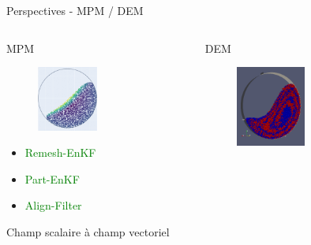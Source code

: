 \documentclass[aspectratio=169]{beamer} %
\newcommand{\cmark}{\ding{51}}%
\begin{document}
\begin{frame}{Perspectives - MPM / DEM}
    \vspace{-0.5cm}
    \begin{columns}[t]
        \begin{column}{0.5\textwidth}
            \small
            \begin{block}{MPM}
                \begin{figure}[b]
                    \includegraphics[width =0.5\textwidth]{../../conference/images/rot_drum_part/rot_drum_part-81.png}
                \end{figure}
                \begin{itemize}
                    \item \textcolor{green}{\cmark  Remesh-EnKF}\\
                    \item \textcolor{green}{\cmark  Part-EnKF}\\
                    \item \textcolor{green}{\cmark  Align-Filter}
                \end{itemize}
                Champ scalaire à champ vectoriel
            \end{block}
        \end{column}
        \begin{column}{0.5\textwidth}
            \begin{block}{DEM}
                \begin{figure}
                    \includegraphics[width =0.5\textwidth]{../CSI_2024/image/rot_drum_dem/rot_drum_dem-101.png}

\end{figure}
\end{block}
\end{column}
\end{columns}
\end{frame}
\end{document}
